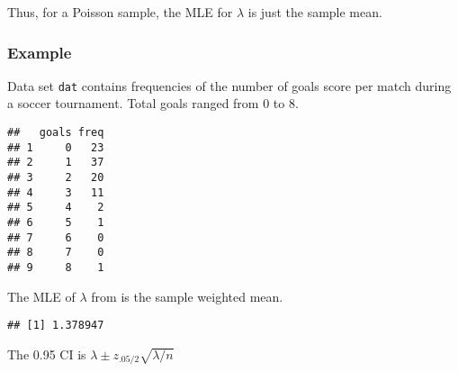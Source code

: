 \documentclass[
]{book}
\newenvironment{Shaded}{\begin{snugshade}}{\end{snugshade}}
\newcommand{\DecValTok}[1]{\textcolor[rgb]{0.00,0.00,0.81}{#1}}
\newcommand{\FloatTok}[1]{\textcolor[rgb]{0.00,0.00,0.81}{#1}}
\newcommand{\KeywordTok}[1]{\textcolor[rgb]{0.13,0.29,0.53}{\textbf{#1}}}
\newcommand{\NormalTok}[1]{#1}
\newcommand{\OperatorTok}[1]{\textcolor[rgb]{0.81,0.36,0.00}{\textbf{#1}}}
\newcommand{\StringTok}[1]{\textcolor[rgb]{0.31,0.60,0.02}{#1}}
\begin{document}
Thus, for a Poisson sample, the MLE for \(\lambda\) is just the sample mean.

\hypertarget{example-1}{%
\subsubsection*{Example}\label{example-1}}

Data set \texttt{dat} contains frequencies of the number of goals score per match during a soccer tournament. Total goals ranged from 0 to 8.

\begin{verbatim}
##   goals freq
## 1     0   23
## 2     1   37
## 3     2   20
## 4     3   11
## 5     4    2
## 6     5    1
## 7     6    0
## 8     7    0
## 9     8    1
\end{verbatim}

The MLE of \(\lambda\) from is the sample weighted mean.

\begin{Shaded}
\end{Shaded}

\begin{verbatim}
## [1] 1.378947
\end{verbatim}

The 0.95 CI is \(\lambda \pm z_{.05/2} \sqrt{\lambda / n}\)

\begin{Shaded}
\end{Shaded}
\end{document}

